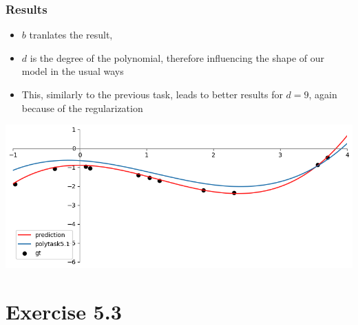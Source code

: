 \documentclass[10pt,aspectratio=169,handout]{beamer}
\begin{document}
\begin{frame}
    \frametitle{Results}

    \begin{minipage}{0.49\textwidth}
        \begin{itemize}
            \item $b$ tranlates the result,
            \item $d$ is the degree of the polynomial, therefore influencing the shape of our model in the usual ways
            \item This, similarly to the previous task, leads to better results for $d=9$, again because of the regularization 
        \end{itemize}
    \end{minipage}
    \begin{minipage}{0.49\textwidth}
        \includegraphics[width=\textwidth]{images/task5-2.png}
    \end{minipage}

\end{frame}

\section{Exercise 5.3}
\end{document}
